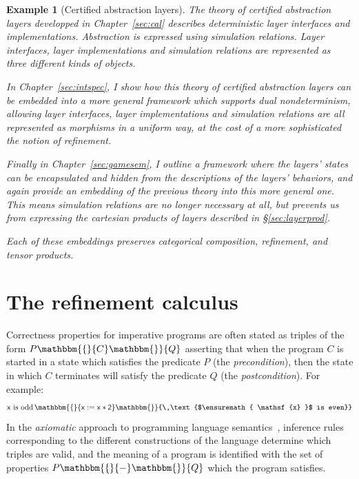 \documentclass[11pt,oneside,draft]{book}
\newtheorem{example}[theorem]{Example}
\theoremstyle{definition}
\newcommand{\kw}[1]{\ensuremath{ \mathsf{#1} }}
\newcommand{\htr}[3]{{ {#1} \mathbbm{\{} {#2} \mathbbm{\}} {#3} }}
\begin{document}
\begin{example}[Certified abstraction layers] %
The theory of certified abstraction layers
developped in Chapter~\ref{sec:cal}
describes deterministic layer interfaces
and implementations.
Abstraction is expressed using simulation relations.
Layer interfaces, layer implementations and simulation relations
are represented as three different kinds of objects.

In Chapter~\ref{sec:intspec},
I show how this theory of certified abstraction layers
can be embedded into a more general framework
which supports dual nondeterminism,
allowing layer interfaces, layer implementations and simulation relations
are all represented as morphisms in a uniform way,
at the cost of a more sophisticated the notion of refinement.

Finally in Chapter~\ref{sec:gamesem},
I outline a framework where the layers' states
can be encapsulated and hidden from
the descriptions of the layers' behaviors,
and again provide an embedding of the previous theory
into this more general one.
This means simulation relations are no longer necessary at all,
but prevents us from expressing the cartesian products
of layers described in \S\ref{sec:layerprod}.

Each of these embeddings preserves categorical composition,
refinement, and tensor products.
\end{example}



\section{The refinement calculus} \label{sec:refcal} %


Correctness properties for imperative programs
are often stated as triples of the form $\htr{P}{C}{Q}$
asserting that
when the program $C$ is started in a state which
satisfies the predicate $P$ (the \emph{precondition}),
then the state in which $C$ terminates
will satisfy the predicate $Q$ (the \emph{postcondition}).
For example:
\[
    \htr{\text{$\kw{x}$ is odd}\,}{\kw{x := x * 2}}{\,\text{$\kw{x}$ is even}}
\]
In the \emph{axiomatic} approach to programming language semantics~\citep{hoare69},
inference rules
corresponding to the different constructions of the language
determine which triples are valid,
and the meaning of a program is identified with
the set of properties $\htr{P}{-}{Q}$
which the program satisfies.
\end{document}
